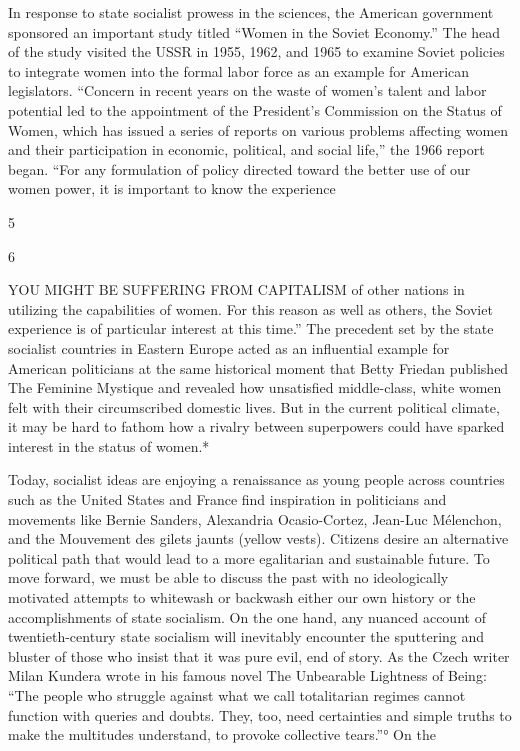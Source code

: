  \par 
In response to state socialist prowess in the sciences, the American government sponsored an important study titled “Women in the Soviet Economy.” The head of the study visited the USSR in 1955, 1962, and 1965 to examine Soviet policies to integrate women into the formal labor force as an example for American legislators. “Concern in recent years on the waste of women’s talent and labor potential led to the appointment of the President's Commission on the Status of Women, which has issued a series of reports on various problems affecting women and their participation in economic, political, and social life,” the 1966 report began. “For any formulation of policy directed toward the better use of our women power, it is important to know the experience
 \par 
5
 \par 
6
 \par 
YOU MIGHT BE SUFFERING FROM CAPITALISM of other nations in utilizing the capabilities of women. For this reason as well as others, the Soviet experience is of particular interest at this time.” The precedent set by the state socialist countries in Eastern Europe acted as an influential example for American politicians at the same historical moment that Betty Friedan published The Feminine Mystique and revealed how unsatisfied middle-class, white women felt with their circumscribed domestic lives. But in the current political climate, it may be hard to fathom how a rivalry between superpowers could have sparked interest in the status of women.*
 \par 
Today, socialist ideas are enjoying a renaissance as young people across countries such as the United States and France find inspiration in politicians and movements like Bernie Sanders, Alexandria Ocasio-Cortez, Jean-Luc Mélenchon, and the Mouvement des gilets jaunts (yellow vests). Citizens desire an alternative political path that would lead to a more egalitarian and sustainable future. To move forward, we must be able to discuss the past with no ideologically motivated attempts to whitewash or backwash either our own history or the accomplishments of state socialism. On the one hand, any nuanced account of twentieth-century state socialism will inevitably encounter the sputtering and bluster of those who insist that it was pure evil, end of story. As the Czech writer Milan Kundera wrote in his famous novel The Unbearable Lightness of Being: “The people who struggle against what we call totalitarian regimes cannot function with queries and doubts. They, too, need certainties and simple truths to make the multitudes understand, to provoke collective tears.”° On the
